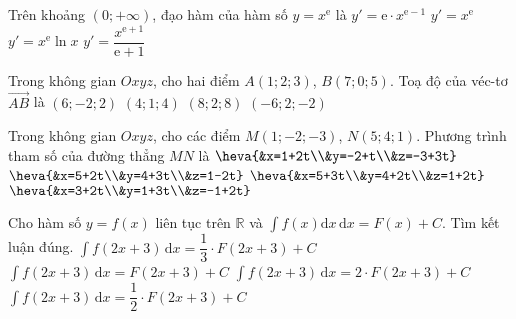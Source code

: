 \begin{ex}%
	Trên khoảng $(0 ;+\infty)$, đạo hàm của hàm số $y=x^{\mathrm{e}}$ là	
	\choice
	{\True $y'=\mathrm{e}\cdot x^{\mathrm{e}-1}$}
	{$y'=x^{\mathrm{e}}$}
	{$y'=x^{\mathrm{e}}\ln x$}
	{$y'=\dfrac{x^{\mathrm{e}+1}}{\mathrm{e}+1}$}
\end{ex}
\begin{ex}%
	Trong không gian $Oxyz$, cho hai điểm $A(1 ; 2 ; 3)$, $B(7 ; 0 ; 5)$. Toạ độ của véc-tơ $\overrightarrow{A B}$ là	
	\choice
	{\True $(6;-2;2)$}
	{$(4;1;4)$}
	{$(8;2;8)$}
	{$(-6;2;-2)$}
\end{ex}
\begin{ex}%
	Trong không gian $O x y z$, cho các điểm $M(1 ;-2 ;-3)$, $N(5 ; 4 ; 1)$. Phương trình tham số của đường thẳng $M N$ là	
	\choice
	{$\heva{&x=1+2t\\&y=-2+t\\&z=-3+3t}$}
	{$\heva{&x=5+2t\\&y=4+3t\\&z=1-2t}$}
	{ $\heva{&x=5+3t\\&y=4+2t\\&z=1+2t}$}
	{\True$\heva{&x=3+2t\\&y=1+3t\\&z=-1+2t}$}
\end{ex}
\begin{ex}%
	Cho hàm số $y=f(x)$ liên tục trên $\mathbb{R}$ và $\displaystyle\int\limits f(x) \mathrm{d} x\mathrm{\,d} x=F(x)+C$. Tìm kết luận đúng.	
	\choice
	{$\displaystyle\int\limits f(2 x+3) \mathrm{\,d} x=\dfrac{1}{3} \cdot F(2 x+3)+C$}
	{$\displaystyle\int\limits f(2 x+3) \mathrm{\,d} x=F(2 x+3)+C$}
	{$\displaystyle\int\limits f(2 x+3) \mathrm{\,d} x=2 \cdot F(2 x+3)+C$}
	{\True $\displaystyle\int\limits f(2 x+3) \mathrm{\,d} x=\dfrac{1}{2} \cdot F(2 x+3)+C$}
\end{ex}
